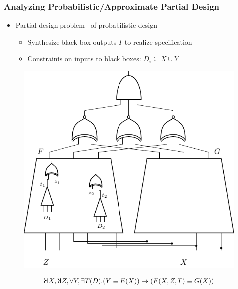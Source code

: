 \begin{frame}
      \frametitle{Analyzing Probabilistic/Approximate Partial Design}
      \begin{itemize}
            \item Partial design problem~\cite{Gitina2013} of probabilistic design
                  \begin{itemize}
                        \item Synthesize black-box outputs $T$ to realize specification
                        \item \alert{Constraints on inputs} to black boxes: $D_i \subseteq X \cup Y$
                  \end{itemize}
      \end{itemize}
      \begin{figure}
            \centering
            \includegraphics[scale=0.5]{fig/dependency-ssat/dssat-prob-miter.pdf}
      \end{figure}
      \begin{align*}
            \random{} X,\random{} Z,\forall Y,\exists T(D).
            (Y \equiv E(X)) \limply (F(X,Z,T) \equiv G(X))
      \end{align*}
\end{frame}